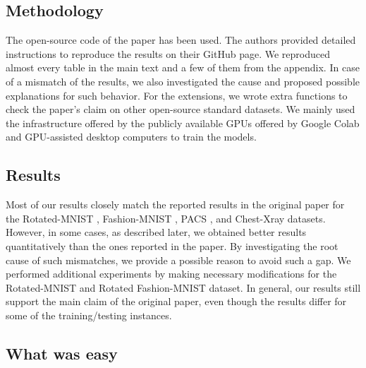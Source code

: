 





\subsection*{Methodology}

The open-source code of the paper has been used. The authors provided detailed instructions to reproduce the results on their GitHub page. We reproduced almost every table in the main text and a few of them from the appendix. In case of a mismatch of the results, we also investigated the cause and proposed possible explanations for such behavior. For the extensions, we wrote extra functions to check the paper's claim on other open-source standard datasets. We mainly used the infrastructure offered by the publicly available GPUs offered by Google Colab and GPU-assisted desktop computers to train the models.

\subsection*{Results}

Most of our results closely match the reported results in the original paper for the Rotated-MNIST \cite{MNIST}, Fashion-MNIST \cite{fashionMNIST}, PACS \cite{DBLP:journals/corr/abs-1710-03077, ssdafcvt_PACS}, and Chest-Xray \cite{chexpert} datasets. However, in some cases, as described later, we obtained better results quantitatively than the ones reported in the paper. By investigating the root cause of such mismatches, we provide a possible reason to avoid such a gap. We performed additional experiments by making necessary modifications for the Rotated-MNIST and Rotated Fashion-MNIST dataset. In general, our results still support the main claim of the original paper, even though the results differ for some of the training/testing instances.

\subsection*{What was easy}

